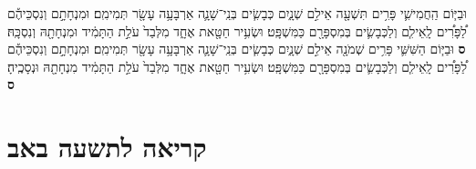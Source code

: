 \documentclass[twoside, openany, parskip=half, 11pt]{book}
\begin{document}
\begin{footnotesize}
\begin{multicols}{2}
וּבַיּ֧וֹם הַֽחֲמִישִׁ֛י פָּרִ֥ים תִּשְׁעָ֖ה אֵילִ֣ם שְׁנָ֑יִם כְּבָשִׂ֧ים בְּנֵֽי־שָׁנָ֛ה אַרְבָּעָ֥ה עָשָׂ֖ר תְּמִימִֽם׃ וּמִנְחָתָ֣ם וְנִסְכֵּיהֶ֡ם לַ֠פָּרִ֠ים לָֽאֵילִ֧ם וְלַכְּבָשִׂ֛ים בְּמִסְפָּרָ֖ם כַּמִּשְׁפָּֽט׃ וּשְׂעִ֥יר חַטָּ֖את אֶחָ֑ד מִלְּבַד֙ עֹלַ֣ת הַתָּמִ֔יד וּמִנְחָתָ֖הּ וְנִסְכָּֽהּ׃ \textbf{ס} 
וּבַיּ֧וֹם הַשִּׁשִּׁ֛י פָּרִ֥ים שְׁמֹנָ֖ה אֵילִ֣ם שְׁנָ֑יִם כְּבָשִׂ֧ים בְּנֵֽי־שָׁנָ֛ה אַרְבָּעָ֥ה עָשָׂ֖ר תְּמִימִֽם׃ וּמִנְחָתָ֣ם וְנִסְכֵּיהֶ֡ם לַ֠פָּרִ֠ים לָֽאֵילִ֧ם וְלַכְּבָשִׂ֛ים בְּמִסְפָּרָ֖ם כַּמִּשְׁפָּֽט׃ וּשְׂעִ֥יר חַטָּ֖את אֶחָ֑ד מִלְּבַד֙ עֹלַ֣ת הַתָּמִ֔יד מִנְחָתָ֖הּ וּנְסָכֶֽיהָ׃ \textbf{ס} 

\end{multicols}

\section[תשעה באב]{קריאה לתשעה באב}




\end{footnotesize}
\end{document}

